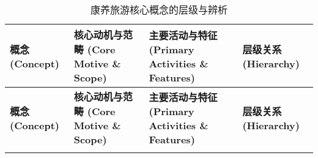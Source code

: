 \documentclass[UTF8, 12pt, a4paper, twoside]{ctexart}
\begin{document}
\begin{xltabular}{\textwidth}{>{\raggedright\arraybackslash}p{0.16\textwidth} >{\raggedright\arraybackslash}X >{\raggedright\arraybackslash}X >{\raggedright\arraybackslash}p{0.14\textwidth}}
	\caption{康养旅游核心概念的层级与辨析}\label{tab:concept_definition_final} \\
	\toprule
	\textbf{概念 (Concept)} & \textbf{核心动机与范畴 (Core Motive \& Scope)} & \textbf{主要活动与特征 (Primary Activities \& Features)} & \textbf{层级关系 (Hierarchy)} \\
	\midrule
	\endfirsthead

	\toprule
	\textbf{概念 (Concept)} & \textbf{核心动机与范畴 (Core Motive \& Scope)} & \textbf{主要活动与特征 (Primary Activities \& Features)} & \textbf{层级关系 (Hierarchy)} \\
	\midrule
	\endhead

	\bottomrule
	\endfoot

	\bottomrule
	\endlastfoot


\end{xltabular}
\end{document}
